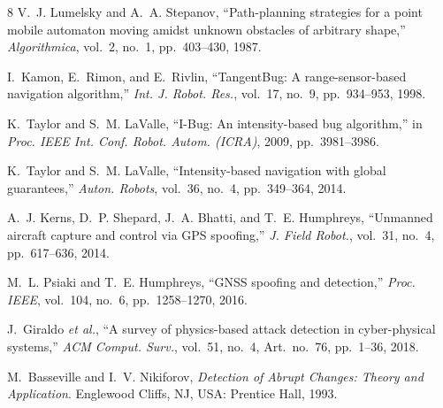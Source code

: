 \documentclass[11pt, a4paper]{article}
\begin{document}
\begin{thebibliography}{8}
\footnotesize
\setlength{\itemsep}{0pt}
V.~J. Lumelsky and A.~A. Stepanov, ``Path-planning strategies for a point mobile automaton moving amidst unknown obstacles of arbitrary shape,'' \textit{Algorithmica}, vol.~2, no.~1, pp.~403--430, 1987.

I.~Kamon, E.~Rimon, and E.~Rivlin, ``TangentBug: A range-sensor-based navigation algorithm,'' \textit{Int. J. Robot. Res.}, vol.~17, no.~9, pp.~934--953, 1998.

K.~Taylor and S.~M. LaValle, ``I-Bug: An intensity-based bug algorithm,'' in \textit{Proc. IEEE Int. Conf. Robot. Autom. (ICRA)}, 2009, pp.~3981--3986.

K.~Taylor and S.~M. LaValle, ``Intensity-based navigation with global guarantees,'' \textit{Auton. Robots}, vol.~36, no.~4, pp.~349--364, 2014.

A.~J. Kerns, D.~P. Shepard, J.~A. Bhatti, and T.~E. Humphreys, ``Unmanned aircraft capture and control via GPS spoofing,'' \textit{J. Field Robot.}, vol.~31, no.~4, pp.~617--636, 2014.

M.~L. Psiaki and T.~E. Humphreys, ``GNSS spoofing and detection,'' \textit{Proc. IEEE}, vol.~104, no.~6, pp.~1258--1270, 2016.

J.~Giraldo \textit{et al.}, ``A survey of physics-based attack detection in cyber-physical systems,'' \textit{ACM Comput. Surv.}, vol.~51, no.~4, Art.~no.~76, pp.~1--36, 2018.

M.~Basseville and I.~V. Nikiforov, \textit{Detection of Abrupt Changes: Theory and Application}. Englewood Cliffs, NJ, USA: Prentice Hall, 1993.
\end{thebibliography}
\end{document}
